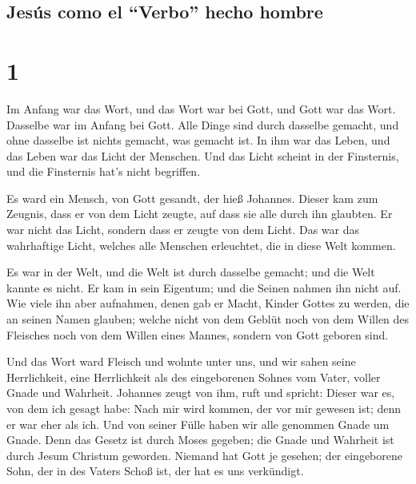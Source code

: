 \hypertarget{jesuxfas-como-el-verbo-hecho-hombre}{%
\subsection{Jesús como el ``Verbo'' hecho
hombre}\label{jesuxfas-como-el-verbo-hecho-hombre}}

\hypertarget{section}{%
\section{1}\label{section}}

 Im Anfang war das Wort, und das Wort war bei Gott, und
Gott war das Wort.  Dasselbe war im Anfang bei Gott.
 Alle Dinge sind durch dasselbe gemacht, und ohne dasselbe
ist nichts gemacht, was gemacht ist.  In ihm war das
Leben, und das Leben war das Licht der Menschen.  Und das
Licht scheint in der Finsternis, und die Finsternis hat's nicht
begriffen.

 Es ward ein Mensch, von Gott gesandt, der hieß Johannes.
 Dieser kam zum Zeugnis, dass er von dem Licht zeugte, auf
dass sie alle durch ihn glaubten.  Er war nicht das Licht,
sondern dass er zeugte von dem Licht.  Das war das
wahrhaftige Licht, welches alle Menschen erleuchtet, die in diese Welt
kommen.

 Es war in der Welt, und die Welt ist durch dasselbe
gemacht; und die Welt kannte es nicht.  Er kam in sein
Eigentum; und die Seinen nahmen ihn nicht auf.  Wie viele
ihn aber aufnahmen, denen gab er Macht, Kinder Gottes zu werden, die an
seinen Namen glauben;  welche nicht von dem Geblüt noch
von dem Willen des Fleisches noch von dem Willen eines Mannes, sondern
von Gott geboren sind.

 Und das Wort ward Fleisch und wohnte unter uns, und wir
sahen seine Herrlichkeit, eine Herrlichkeit als des eingeborenen Sohnes
vom Vater, voller Gnade und Wahrheit.  Johannes zeugt von
ihm, ruft und spricht: Dieser war es, von dem ich gesagt habe: Nach mir
wird kommen, der vor mir gewesen ist; denn er war eher als ich.
 Und von seiner Fülle haben wir alle genommen Gnade um
Gnade.  Denn das Gesetz ist durch Moses gegeben; die
Gnade und Wahrheit ist durch Jesum Christum geworden. 
Niemand hat Gott je gesehen; der eingeborene Sohn, der in des Vaters
Schoß ist, der hat es uns verkündigt.

